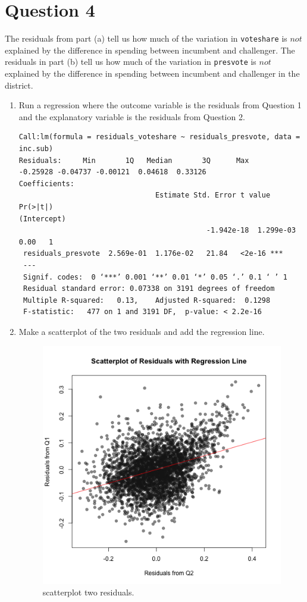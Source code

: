\documentclass[12pt,letterpaper]{article}
\begin{document}
\newpage	
\section*{Question 4}
\noindent The residuals from part (a) tell us how much of the variation in \texttt{voteshare} is $not$ explained by the difference in spending between incumbent and challenger. The residuals in part (b) tell us how much of the variation in \texttt{presvote} is $not$ explained by the difference in spending between incumbent and challenger in the district.
	\begin{enumerate}
		\item Run a regression where the outcome variable is the residuals from Question 1 and the explanatory variable is the residuals from Question 2.
 	
\begin{verbatim}
Call:lm(formula = residuals_voteshare ~ residuals_presvote, data = inc.sub)
Residuals:     Min       1Q   Median       3Q      Max 
-0.25928 -0.04737 -0.00121  0.04618  0.33126 
Coefficients:                     
                      			Estimate Std. Error t value Pr(>|t|)    
(Intercept)       
 											-1.942e-18  1.299e-03    0.00   1    
 residuals_presvote  2.569e-01  1.176e-02   21.84   <2e-16 ***
 ---
 Signif. codes:  0 ‘***’ 0.001 ‘**’ 0.01 ‘*’ 0.05 ‘.’ 0.1 ‘ ’ 1
 Residual standard error: 0.07338 on 3191 degrees of freedom
 Multiple R-squared:   0.13,	Adjusted R-squared:  0.1298 
 F-statistic:   477 on 1 and 3191 DF,  p-value: < 2.2e-16
\end{verbatim} 	
		\item Make a scatterplot of the two residuals and add the regression line. 	
 	
	\begin{figure}[h!]\centering
	\caption{\footnotesize scatterplot two residuals.}
	\label{fig:plot_4}
	\includegraphics[width=.65\textwidth]{scatterplot_residuals_q1_q2.png}

\end{figure}
\end{enumerate}
\end{document}

